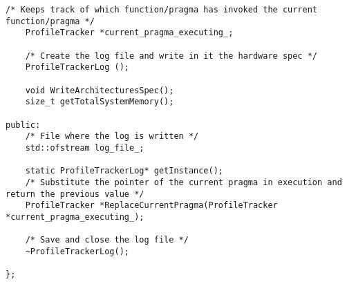 \documentclass[a4paper,10pt,twoside]{book}
\begin{document}
\begin{lstlisting}[language=CCC, caption=profile\_tracker.h]
	/* Keeps track of which function/pragma has invoked the current function/pragma */
	ProfileTracker *current_pragma_executing_;

	/* Create the log file and write in it the hardware spec */
	ProfileTrackerLog ();

	void WriteArchitecturesSpec();
	size_t getTotalSystemMemory();    

public:
	/* File where the log is written */
	std::ofstream log_file_;

	static ProfileTrackerLog* getInstance();
	/* Substitute the pointer of the current pragma in execution and return the previous value */
	ProfileTracker *ReplaceCurrentPragma(ProfileTracker *current_pragma_executing_);

	/* Save and close the log file */
	~ProfileTrackerLog();

};
\end{lstlisting}
\end{document}
